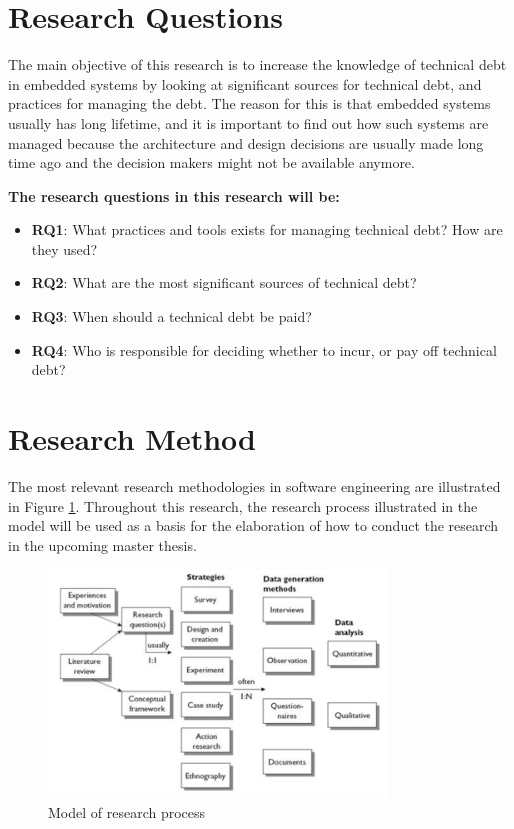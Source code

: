 \section{Research Questions}
The main objective of this research is to increase the knowledge of technical debt in embedded systems by looking at significant sources for technical debt, and practices for managing the debt. The reason for this is that embedded systems usually has long lifetime, and it is important to find out how such systems are managed because the architecture and design decisions are usually made long time ago and the decision makers might not be available anymore. 

\textbf{The research questions in this research will be:} 
\begin{itemize}
	\item \textbf{RQ1}: What practices and tools exists for managing technical debt? How are they used?
	\item \textbf{RQ2}: What are the most significant sources of technical debt?
	\item \textbf{RQ3}: When should a technical debt be paid?
	\item \textbf{RQ4}: Who is responsible for deciding whether to incur, or pay off technical debt?
\end{itemize}

\section{Research Method}
The most relevant research methodologies in software engineering are illustrated in Figure \ref{fig:researchProcess}. Throughout this research, the research process illustrated in the model will be used as a basis for the elaboration of how to conduct the research in the upcoming master thesis. 

\begin{figure}[H]
	\centering
	\includegraphics[width=0.8\textwidth]{images/researchStrategies.png}
	\caption{Model of research process\cite{Oates:2006:RIS:1202299}}
	\label{fig:researchProcess}
\end{figure}


